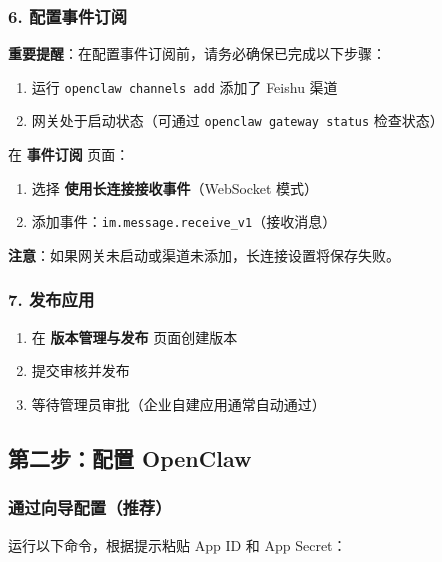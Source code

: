 
\subsubsection{6. 配置事件订阅}


 \textbf{重要提醒}：在配置事件订阅前，请务必确保已完成以下步骤：

\begin{enumerate}
  \item 运行 \texttt{openclaw channels add} 添加了 Feishu 渠道
  \item 网关处于启动状态（可通过 \texttt{openclaw gateway status} 检查状态）
\end{enumerate}


在 \textbf{事件订阅} 页面：

\begin{enumerate}
  \item 选择 \textbf{使用长连接接收事件}（WebSocket 模式）
  \item 添加事件：\texttt{im.message.receive\_v1}（接收消息）
\end{enumerate}


 \textbf{注意}：如果网关未启动或渠道未添加，长连接设置将保存失败。


\subsubsection{7. 发布应用}


\begin{enumerate}
  \item 在 \textbf{版本管理与发布} 页面创建版本
  \item 提交审核并发布
  \item 等待管理员审批（企业自建应用通常自动通过）
\end{enumerate}


\hrulefill


\subsection{第二步：配置 OpenClaw}


\subsubsection{通过向导配置（推荐）}


运行以下命令，根据提示粘贴 App ID 和 App Secret：

